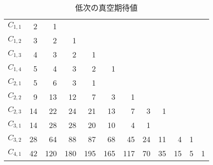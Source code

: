 {\begin{table}[htbp]
\begin{center}
\begin{tabular}{r|r|r|r|r|r|r|r|r|r|r|r|}
$C_{1, 1}$ & 2 & 1 & & & & & & & & & \\
$C_{1, 2}$ & 3 & 2 & 1 & & & & & & & & \\
$C_{1, 3}$ & 4 & 3 & 2 & 1 & & & & & & & \\
$C_{1, 4}$ & 5 & 4 & 3 & 2 & 1 & & & & & & \\\hline
$C_{2, 1}$ & 5 & 6 & 3 & 1 & & & & & & & \\
$C_{2, 2}$ & 9 & 13 & 12 & 7 & 3 & 1 & & & & & \\
$C_{2, 3}$ & 14 & 22 & 24 & 21 & 13 & 7 & 3 & 1 & & & \\\hline
$C_{3, 1}$ & 14 & 28 & 28 & 20 & 10 & 4 & 1 & & & & \\
$C_{3, 2}$ & 28 & 64 & 88 & 87 & 68 & 45 & 24 & 11 & 4 & 1 & \\\hline
$C_{4, 1}$ & 42 & 120 & 180 & 195 & 165 & 117 & 70 & 35 & 15 & 5 & 1 \\\hline
		\end{tabular}\end{center}
		\caption{低次の真空期待値}\label{table:低次の真空期待値}
	\end{table} %

}
